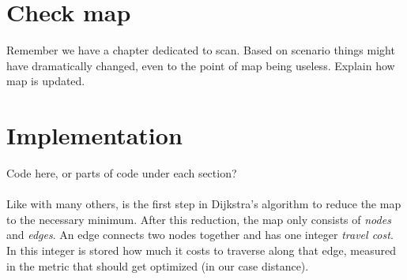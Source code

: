 \section{Check map}
\label{sec:map_check} %
Remember we have a chapter dedicated to scan.\linebreak
Based on scenario things might have dramatically changed, even to the point of map being useless. Explain how map is updated.

\section{Implementation}
\label{sec:map} %
Code here, or parts of code under each section?\\
\\
Like with many others,
is the first step in Dijkstra's algorithm to reduce the map to the necessary minimum.
After this reduction, the map only consists of \emph{nodes} and \emph{edges}.
An edge connects two nodes together and has one integer \emph{travel cost}.
In this integer is stored how much it costs to traverse along that edge,
measured in the metric that should get optimized (in our case distance).



